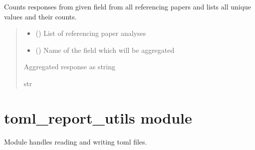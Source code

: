 \documentclass[letterpaper,10pt,english]{sphinxmanual}
\begin{document}

\begin{fulllineitems}
\label{\detokenize{reference_analysis_aggregation:reference_analysis_aggregation.value_count_aggregation}}
\pysigstartsignatures
\pysiglinewithargsret
{}
{\sphinxparamcomma {}}
{}
\pysigstopsignatures
\sphinxAtStartPar
Counts responses from given field from all referencing papers and lists all unique values and their counts.
\begin{quote}\begin{description}
\begin{itemize}
\item {} 
\sphinxAtStartPar
{} () \textendash{} List of referencing paper analyses

\item {} 
\sphinxAtStartPar
{} () \textendash{} Name of the field which will be aggregated

\end{itemize}

\sphinxAtStartPar
Aggregated response as string

\sphinxAtStartPar
str

\end{description}\end{quote}

\end{fulllineitems}


\sphinxstepscope


\section{toml\_report\_utils module}
\label{\detokenize{toml_report_utils:module-toml_report_utils}}\label{\detokenize{toml_report_utils:toml-report-utils-module}}\label{\detokenize{toml_report_utils::doc}}
\sphinxAtStartPar
Module handles reading and writing toml files.
\end{document}
